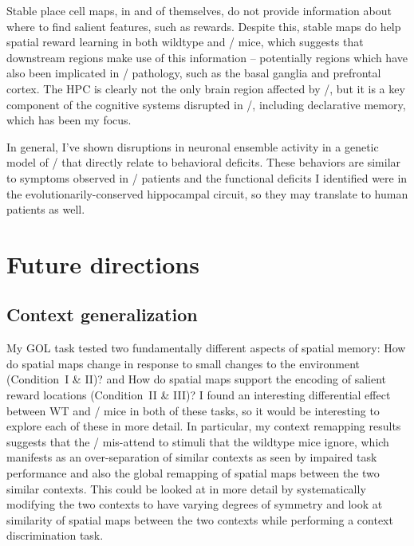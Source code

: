 Stable place cell maps, in and of themselves, do not provide information about where to find salient features, such as rewards. Despite this, stable maps do help spatial reward learning in both wildtype and \df/ mice, which suggests that downstream regions make use of this information -- potentially regions which have also been implicated in \scz/ pathology, such as the basal ganglia and prefrontal cortex. The \ac{HPC} is clearly not the only brain region affected by \scz/, but it is a key component of the cognitive systems disrupted in \scz/, including declarative memory, which has been my focus.

In general, I've shown disruptions in neuronal ensemble activity in a genetic model of \scz/ that directly relate to behavioral deficits.
These behaviors are similar to symptoms observed in \scz/ patients and the functional deficits I identified were in the evolutionarily-conserved hippocampal circuit, so they may translate to human patients as well.


\section{Future directions}

\subsection{Context generalization}
My \ac{GOL} task tested two fundamentally different aspects of spatial memory: How do spatial maps change in response to small changes to the environment (Condition~I \& II)? and How do spatial maps support the encoding of salient reward locations (Condition~II \& III)?
I found an interesting differential effect between WT and \df/ mice in both of these tasks, so it would be interesting to explore each of these in more detail.
In particular, my context remapping results suggests that the \df/ mis-attend to stimuli that the wildtype mice ignore, which manifests as an over-separation of similar contexts as seen by impaired task performance and also the global remapping of spatial maps between the two similar contexts.
This could be looked at in more detail by systematically modifying the two contexts to have varying degrees of symmetry and look at similarity of spatial maps between the two contexts while performing a context discrimination task.

